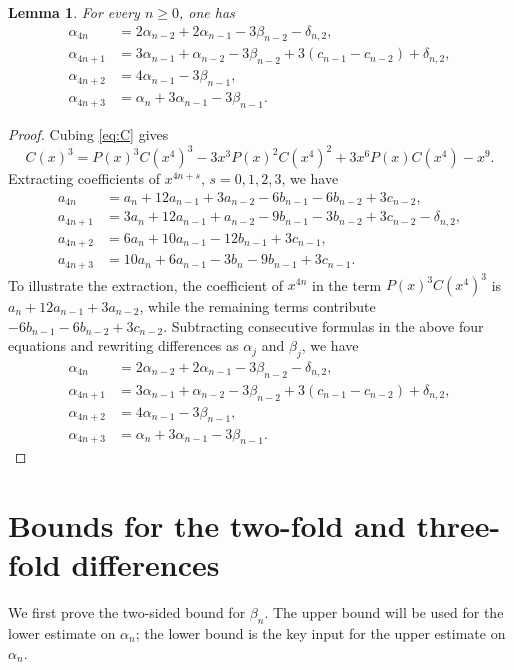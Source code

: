 \documentclass[11pt]{amsart}
\newtheorem{lemma}[theorem]{Lemma}
\theoremstyle{remark}
\theoremstyle{plain}
\begin{document}
\begin{lemma}\label{lem:alpha-rec}
For every $n\ge 0$, one has
\[
\begin{aligned}
\alpha_{4n}&=2\alpha_{n-2}+2\alpha_{n-1}-3\beta_{n-2}-\delta_{n,2},\\
\alpha_{4n+1}&=3\alpha_{n-1}+\alpha_{n-2}-3\beta_{n-2}+3(c_{n-1}-c_{n-2})+\delta_{n,2},\\
\alpha_{4n+2}&=4\alpha_{n-1}-3\beta_{n-1},\\
\alpha_{4n+3}&=\alpha_n+3\alpha_{n-1}-3\beta_{n-1}.
\end{aligned}
\]
\end{lemma}

\begin{proof}
Cubing \eqref{eq:C} gives
\[
C(x)^3=P(x)^3C(x^4)^3-3x^3P(x)^2C(x^4)^2+3x^6P(x)C(x^4)-x^9.
\]
Extracting coefficients of $x^{4n+s}$, $s=0,1,2,3$, we have
\[
\begin{aligned}
a_{4n}&=a_n+12a_{n-1}+3a_{n-2}-6b_{n-1}-6b_{n-2}+3c_{n-2},\\
a_{4n+1}&=3a_n+12a_{n-1}+a_{n-2}-9b_{n-1}-3b_{n-2}+3c_{n-2}-\delta_{n,2},\\
a_{4n+2}&=6a_n+10a_{n-1}-12b_{n-1}+3c_{n-1},\\
a_{4n+3}&=10a_n+6a_{n-1}-3b_n-9b_{n-1}+3c_{n-1}.
\end{aligned}
\]
To illustrate the extraction, the coefficient of $x^{4n}$ in the term $P(x)^3C(x^4)^3$ is $a_n+12a_{n-1}+3a_{n-2}$, while the remaining terms contribute $-6b_{n-1}-6b_{n-2}+3c_{n-2}$.
Subtracting consecutive formulas in the above four equations and rewriting differences as $\alpha_j$ and $\beta_j$, we have
\[
\begin{aligned}
\alpha_{4n}&=2\alpha_{n-2}+2\alpha_{n-1}-3\beta_{n-2}-\delta_{n,2},\\
\alpha_{4n+1}&=3\alpha_{n-1}+\alpha_{n-2}-3\beta_{n-2}+3(c_{n-1}-c_{n-2})+\delta_{n,2},\\
\alpha_{4n+2}&=4\alpha_{n-1}-3\beta_{n-1},\\
\alpha_{4n+3}&=\alpha_n+3\alpha_{n-1}-3\beta_{n-1}.
\end{aligned}
\]
\end{proof}

\section{Bounds for the two-fold and three-fold differences}

We first prove the two-sided bound for $\beta_n$. The upper bound will be used for the lower estimate on $\alpha_n$; the lower bound is the key input for the upper estimate on $\alpha_n$.
\end{document}

